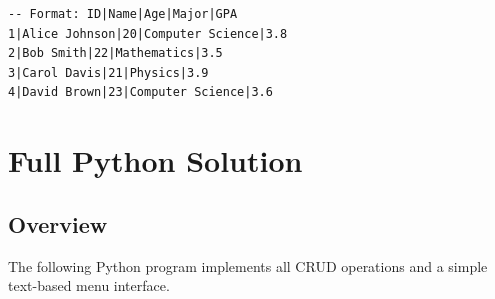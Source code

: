 \documentclass[12pt,a4paper]{article}
\begin{document}
\begin{lstlisting}[caption=Sample Database: students.txt]
-- Format: ID|Name|Age|Major|GPA
1|Alice Johnson|20|Computer Science|3.8
2|Bob Smith|22|Mathematics|3.5
3|Carol Davis|21|Physics|3.9
4|David Brown|23|Computer Science|3.6
\end{lstlisting}

\section{Full Python Solution}

\subsection{Overview}
The following Python program implements all CRUD operations and a simple text-based menu interface.
\end{document}
